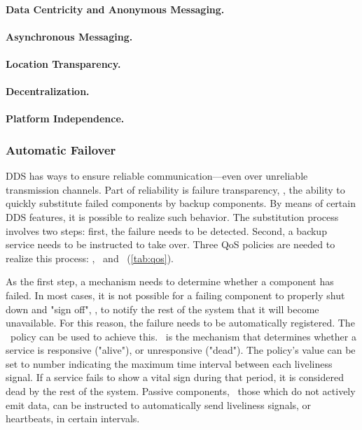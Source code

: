 \paragraph{Data Centricity and Anonymous Messaging.}

\paragraph{Asynchronous Messaging.}

\paragraph{Location Transparency.}

\paragraph{Decentralization.}

\paragraph{Platform Independence.}


\subsubsection{Automatic Failover} \label{sec:failover}
DDS has ways to ensure reliable communication---even over unreliable transmission channels. Part of reliability is failure transparency, \ie , the ability to quickly substitute failed components by backup components. By means of certain DDS features, it is possible to realize such behavior. The substitution process involves two steps: first, the failure needs to be detected. Second, a backup service needs to be instructed to take over. Three QoS policies are needed to realize this process: \ownership , \ostrength\ and \liveliness\ (\cf \autoref{tab:qos}).

As the first step, a mechanism needs to determine whether a component has failed. In most cases, it is not possible for a failing component to properly shut down and "sign off", \ie , to notify the rest of the system that it will become unavailable. For this reason, the failure needs to be automatically registered. The \liveliness\ policy can be used to achieve this. \liveliness\ is the mechanism that determines whether a service is responsive ("alive"), or unresponsive ("dead"). The policy's value can be set to number indicating the maximum time interval between each liveliness signal. If a service fails to show a vital sign during that period, it is considered dead by the rest of the system. Passive components, \ie\ those which do not actively emit data, can be instructed to automatically send liveliness signals, or heartbeats, in certain intervals.

